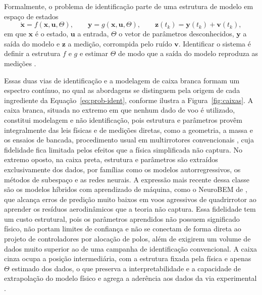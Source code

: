 {\color{blue}Formalmente, o problema de identificação parte de uma estrutura de modelo em espaço de estados
\begin{equation}
\dot{\mathbf{x}} = f(\mathbf{x},\mathbf{u},\Theta), \qquad
\mathbf{y} = g(\mathbf{x},\mathbf{u},\Theta), \qquad
\mathbf{z}(t_k) = \mathbf{y}(t_k) + \mathbf{v}(t_k),
\label{eq:prob-ident}
\end{equation}
em que $\mathbf{x}$ é o estado, $\mathbf{u}$ a entrada, $\Theta$ o vetor de parâmetros desconhecidos, $\mathbf{y}$ a saída do modelo e $\mathbf{z}$ a medição, corrompida pelo ruído $\mathbf{v}$. Identificar o sistema é definir a estrutura $f$ e $g$ e estimar $\Theta$ de modo que a saída do modelo reproduza as medições \cite{Jategaonkar2015}.

Essas duas vias de identificação e a modelagem de caixa branca formam um espectro contínuo, no qual as abordagens se distinguem pela origem de cada ingrediente da Equação~\eqref{eq:prob-ident}, conforme ilustra a Figura~\ref{fig:caixas}. A caixa branca, situada no extremo em que nenhum dado de voo é utilizado, constitui modelagem e não identificação, pois estrutura e parâmetros provêm integralmente das leis físicas e de medições diretas, como a geometria, a massa e os ensaios de bancada, procedimento usual em multirrotores convencionais \cite{Bouabdallah2007, Carino2015}, cuja fidelidade fica limitada pelos efeitos que a física simplificada não captura. No extremo oposto, na caixa preta, estrutura e parâmetros são extraídos exclusivamente dos dados, por famílias como os modelos autorregressivos, os métodos de subespaço e as redes neurais. A expressão mais recente dessa classe são os modelos híbridos com aprendizado de máquina, como o NeuroBEM de \textcite{Bauersfeld2021}, que alcança erros de predição muito baixos em voos agressivos de quadrirrotor ao aprender os resíduos aerodinâmicos que a teoria não captura. Essa fidelidade tem um custo estrutural, pois os parâmetros aprendidos não possuem significado físico, não portam limites de confiança e não se conectam de forma direta ao projeto de controladores por alocação de polos, além de exigirem um volume de dados muito superior ao de uma campanha de identificação convencional. A caixa cinza ocupa a posição intermediária, com a estrutura fixada pela física e apenas $\Theta$ estimado dos dados, o que preserva a interpretabilidade e a capacidade de extrapolação do modelo físico e agrega a aderência aos dados da via experimental \cite{Aguirre2015}.

}
